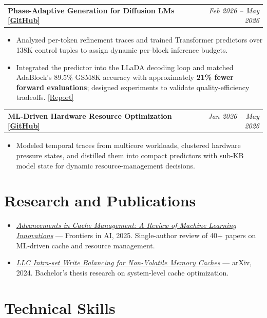 \documentclass[10pt,letterpaper]{article}
\makeatletter
\newcommand{\project}[2]{%
  \begin{tabularx}{\textwidth}{@{}Xr@{}}
    \textbf{#1} & \textit{#2}
  \end{tabularx}\vspace{-0.25em}
}
\makeatother
\begin{document}
\vspace{0.55em}
\project{Phase-Adaptive Generation for Diffusion LMs \href{https://github.com/k-keshav-k/Phase-Assisted-Generation}{[GitHub]}}{Feb 2026 -- May 2026}
\begin{itemize}
  \item Analyzed per-token refinement traces and trained Transformer predictors over 138K control tuples to assign dynamic per-block inference budgets.
  \item Integrated the predictor into the LLaDA decoding loop and matched AdaBlock's 89.5\% GSM8K accuracy with approximately \textbf{21\% fewer forward evaluations}; designed experiments to validate quality-efficiency tradeoffs. \href{https://github.com/k-keshav-k/Phase-Assisted-Generation/blob/main/writeup/final_report.pdf}{[Report]}
\end{itemize}

\vspace{0.55em}
\project{ML-Driven Hardware Resource Optimization \href{https://github.com/k-keshav-k/ML-based-hardware-optimization-using-Phases}{[GitHub]}}{Jan 2026 -- May 2026}
\begin{itemize}
  \item Modeled temporal traces from multicore workloads, clustered hardware pressure states, and distilled them into compact predictors with sub-KB model state for dynamic resource-management decisions.
\end{itemize}

\section{Research and Publications}

\begin{itemize}
  \item \href{https://www.frontiersin.org/journals/artificial-intelligence/articles/10.3389/frai.2025.1441250/full}{\textit{Advancements in Cache Management: A Review of Machine Learning Innovations}} --- Frontiers in AI, 2025. Single-author review of 40+ papers on ML-driven cache and resource management.
  \item \href{https://arxiv.org/abs/2410.15344}{\textit{LLC Intra-set Write Balancing for Non-Volatile Memory Caches}} --- arXiv, 2024. Bachelor's thesis research on system-level cache optimization.
\end{itemize}

\section{Technical Skills}
\end{document}
